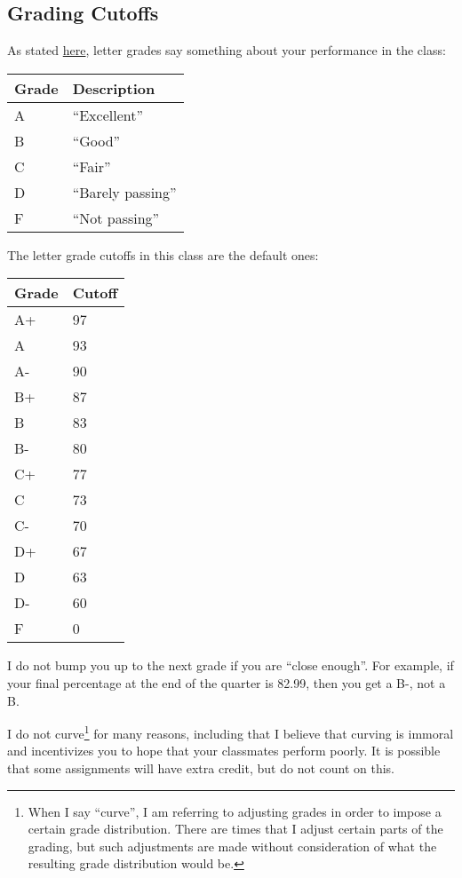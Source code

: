 \documentclass{article}
\begin{document}
\subsection{Grading Cutoffs}

As stated \href{https://registrar.ucdavis.edu/records/grades/letter}{here}, letter grades say something about your performance in the class:

\begin{tabular}{|l|l|}
\hline
Grade & Description \\ \hline
A     & ``Excellent''     \\ \hline
B     & ``Good''     \\ \hline
C     & ``Fair''     \\ \hline
D     & ``Barely passing''     \\ \hline
F     & ``Not passing''      \\ \hline
\end{tabular}

\vspace{1em}
The letter grade cutoffs in this class are the default ones:

\begin{tabular}{|l|l|}
\hline
Grade & Cutoff \\ \hline
A+    & 97     \\ \hline
A     & 93     \\ \hline
A-    & 90     \\ \hline
B+    & 87     \\ \hline
B     & 83     \\ \hline
B-    & 80     \\ \hline
C+    & 77     \\ \hline
C     & 73     \\ \hline
C-    & 70     \\ \hline
D+    & 67     \\ \hline
D     & 63     \\ \hline
D-    & 60     \\ \hline
F     & 0      \\ \hline
\end{tabular}

\vspace{1em}
I do not bump you up to the next grade if you are ``close enough''. For example, if your final percentage at the end of the quarter is 82.99, then you get a B-, not a B.

I do not curve\footnote{When I say ``curve'', I am referring to adjusting grades in order to impose a certain grade distribution. There are times that I adjust certain parts of the grading, but such adjustments are made without consideration of what the resulting grade distribution would be.} for many reasons, including that I believe that curving is immoral and incentivizes you to hope that your classmates perform poorly. It is possible that some assignments will have extra credit, but do not count on this.
\end{document}
